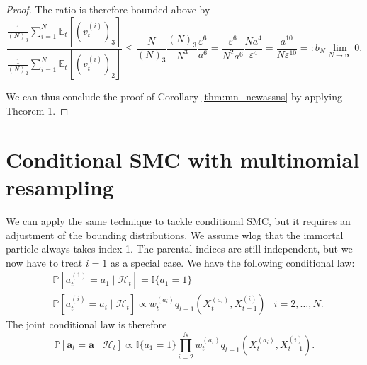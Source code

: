 \documentclass[fleqn]{article}
\theoremstyle{definition}
\newcommand{\PR}{\mathbb{P}}
\newcommand{\E}{\mathbb{E}}
\newcommand{\I}[1]{\mathbb{I}\{#1\}}
\newcommand{\1}[1]{\mathbbm{1}_{\{#1\}}}
\newcommand{\limNtoinfty}{\underset{N\to\infty}{\lim}}
\newcommand{\vt}[2][t]{v_{#1}^{(#2)}}
\newcommand{\wt}[2][t]{w_{#1}^{(#2)}}
\begin{document}
\begin{proof}
The ratio is therefore bounded above by
\begin{equation*}
\frac{\frac{1}{(N)_3} \sum_{i=1}^N \E_t[(\vt{i})_3]}{\frac{1}{(N)_2} \sum_{i=1}^N \E_t[(\vt{i})_2]}
\leq \frac{N}{(N)_3} \frac{(N)_3}{N^3}\frac{\varepsilon^6}{a^6}
= \frac{\varepsilon^6}{N^2a^6} \frac{Na^4}{\varepsilon^4} = \frac{a^{10}}{N\varepsilon^{10}} =: b_N \limNtoinfty 0.
\end{equation*}

We can thus conclude the proof of Corollary \ref{thm:mn_newassns} by applying Theorem 1.
\end{proof}


\section*{Conditional SMC with multinomial resampling}
We can apply the same technique to tackle conditional SMC, but it requires an adjustment of the bounding distributions.
We assume wlog that the immortal particle always takes index 1.
The parental indices are still independent, but we now have to treat $i=1$ as a special case. We have the following conditional law:
\begin{align*}
&\PR [a_t^{(1)} = a_1 \mid \mathcal{H}_t] = \I{a_1=1}  & \\
&\PR [a_t^{(i)} = a_i \mid \mathcal{H}_t] \propto \wt{a_i} q_{t-1}(X_t^{(a_i)}, X_{t-1}^{(i)}) & i=2,\dots,N .
\end{align*}
The joint conditional law is therefore
\begin{equation*}
\PR [\mathbf{a}_t = \mathbf{a} \mid \mathcal{H}_t] \propto \I{a_1 = 1} \prod_{i=2}^N \wt{a_i} q_{t-1}(X_t^{(a_i)}, X_{t-1}^{(i)}).
\end{equation*}
\end{document}
